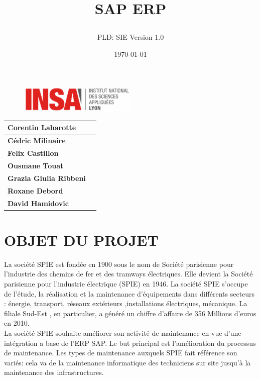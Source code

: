 \documentclass[]{scrartcl}
\title{SAP ERP
\subtitle{}
\author{PLD: SIE
Version 1.0}
\date{\today}}
\begin{document}
\maketitle

\begin{figure}[h]
	\centering
  \includegraphics[width=0.5\textwidth]{img/insa-logo}
	\label{fig:logo}
\end{figure}


\begin{center}
  \begin{tabular}{ | l | r | }
    \hline
    \textbf{Corentin Laharotte}\\ \hline
    \textbf{Cédric Milinaire }\\ \hline
    \textbf{Felix Castillon}\\ \hline
    \textbf{Ousmane Touat}\\ \hline
	\textbf{Grazia Giulia Ribbeni }\\ \hline
	\textbf{Roxane Debord} \\ \hline 
	    \textbf{David Hamidovic}\\ \hline
  \end{tabular}
\end{center}

\thispagestyle{empty}
\pagebreak
\vspace*{10pt}
\tableofcontents
\listoffigures
\newpage
\section{OBJET DU PROJET}
La société SPIE est fondée en 1900 sous le nom de Société parisienne pour l'industrie des chemins de fer et des tramways électriques. Elle devient la Société parisienne pour l'industrie électrique  (SPIE) en 1946. La société SPIE s'occupe de l'étude, la réalisation et la maintenance d'équipements dans différents secteurs : énergie, transport, réseaux extérieurs ,installations électriques, mécanique. La filiale Sud-Est , en particulier, a généré un chiffre d'affaire de 356 Millions d'euros en 2010.\\

La société SPIE souhaite améliorer son activité de maintenance en vue d'une intégration a base de l'ERP SAP. Le but principal est l'amélioration du processus de maintenance. Les types de maintenance auxquels SPIE fait référence son variés: cela va de la maintenance informatique des techniciens sur site jusqu'à la maintenance des infrastructures. \\
\end{document}

